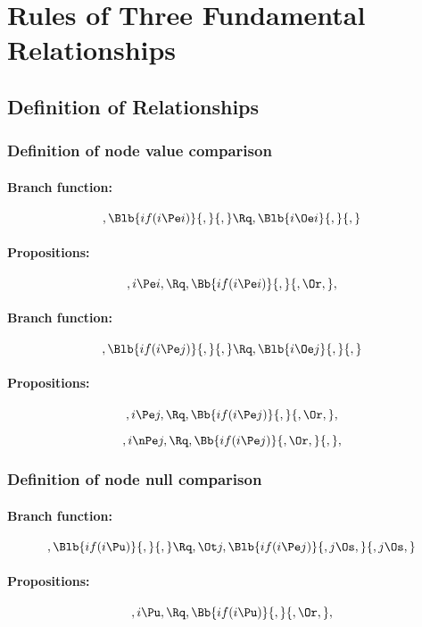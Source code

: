 
\chapter{Rules of Three Fundamental Relationships}

\section{Definition of Relationships}

\subsection{Definition of node value comparison}
\subsubsection{Branch function:}
\[, \Blb{if(i \Pe i)}{,}{,} \Rq , \Blb{i \Oe i}{,}{,}\]
\bigskip
\subsubsection{Propositions:}
\[,i \Pe i, \Rq ,\Bb{if(i \Pe i)}{,}{,\Or,},\]

\bigskip
\bigskip

\subsubsection{Branch function:}
\[, \Blb{if(i \Pe j)}{,}{,} \Rq , \Blb{i \Oe j}{,}{,}\]
\bigskip
\subsubsection{Propositions:}
\[,i \Pe j, \Rq ,\Bb{if(i \Pe j)}{,}{,\Or,},\]

\[,i \nPe j, \Rq ,\Bb{if(i \Pe j)}{,\Or,}{,},\]



\newpage
\subsection{Definition of node null comparison}
\subsubsection{Branch function:}
\[, \Blb{if(i \Pu )}{,}{,} \Rq , \Ot j, \Blb{if(i \Pe j)}{,j \Os,}{,j \Os,}\]
\bigskip
\subsubsection{Propositions:}
\[,i \Pu , \Rq ,\Bb{if(i \Pu)}{,}{,\Or,},\]


